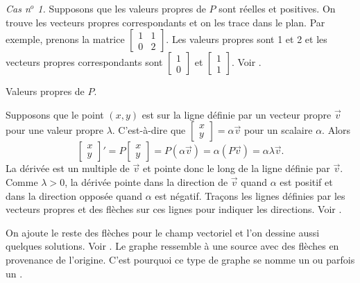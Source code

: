\emph{Cas n$^o$ 1.}  Supposons que les valeurs propres de $P$ sont réelles et positives. On trouve les vecteurs propres correspondants et on les trace dans le plan. Par exemple, prenons la matrice $\left[ \begin{smallmatrix} 1 & 1 \\ 0 & 2 \end{smallmatrix}
\right]$.
Les valeurs propres sont 1 et 2 et les vecteurs propres correspondants sont
$\left[ \begin{smallmatrix} 1 \\ 0 \end{smallmatrix} \right]$ et
$\left[ \begin{smallmatrix} 1 \\ 1 \end{smallmatrix} \right]$. Voir
.

\begin{mywrapfig}{3.25in}
\capstart
{}
\caption{Valeurs propres de $P$.\label{pln:source-eigfig}}
\end{mywrapfig}

Supposons que le point $(x,y)$ est sur la ligne définie par un vecteur propre
$\vec{v}$ pour une valeur propre $\lambda$.
C’est-à-dire que
$\left[ \begin{smallmatrix} x \\ y \end{smallmatrix} \right] = \alpha \vec{v}$
pour un scalaire $\alpha$.
Alors 
\begin{equation*}
\begin{bmatrix} x \\ y \end{bmatrix} '
=
P \begin{bmatrix} x \\ y \end{bmatrix}
=
P ( \alpha \vec{v} ) =  \alpha ( P \vec{v} )
= \alpha \lambda \vec{v} .
\end{equation*}
La dérivée est un multiple de $\vec{v}$ et pointe donc le long de la ligne définie par $\vec{v}$.  Comme $\lambda > 0$, la dérivée pointe dans la direction de $\vec{v}$ quand $\alpha$ est positif et dans la direction opposée quand $\alpha$ est négatif. Traçons les lignes définies par les vecteurs propres et des flèches sur ces lignes pour indiquer les directions.
Voir .

On ajoute le reste des flèches pour le champ vectoriel et l'on dessine aussi quelques solutions. Voir
.
Le graphe ressemble à une source avec des flèches en provenance de l’origine. C’est pourquoi ce type de graphe se nomme un \emph{} ou parfois un \emph{}.

